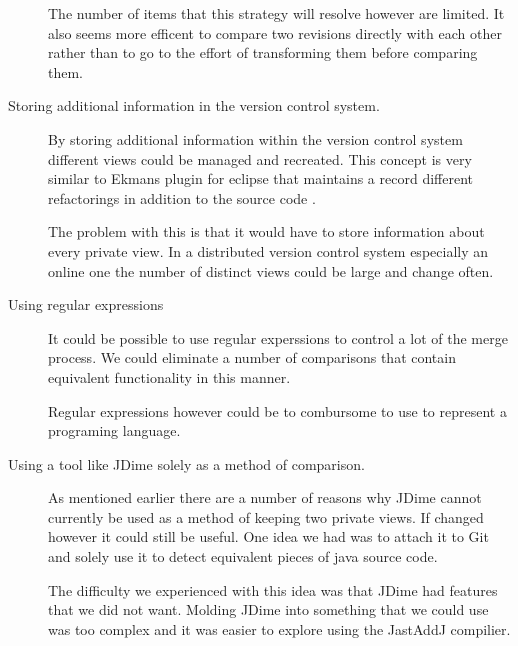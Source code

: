 \begin{description}
    The number of items that this strategy will resolve however are limited. It also seems more efficent to compare two revisions directly with each other rather than to go to the effort of transforming them before comparing them. 
  \item [Storing additional information in the version control system.]
    By storing additional information within the version control system different views could be managed and recreated.
    This concept is very similar to Ekmans plugin for eclipse that maintains a record different refactorings in addition to the source code \cite{Ekman2004}.

    The problem with this is that it would have to store information about every private view.  In a distributed version control system especially an online one the number of distinct views could be large and change often.   
  \item [Using regular expressions]
   It could be possible to use regular experssions to control a lot of the merge process.  We could eliminate a number of comparisons that contain equivalent functionality in this manner.

   Regular expressions however could be to combursome to use to represent a programing language.

    
  \item [Using a tool like JDime solely as a method of comparison.]
    As mentioned earlier there are a number of reasons why JDime cannot currently be used as a method of keeping two private views. If changed however it could still be useful.  One idea we had was to attach it to Git and solely use it to detect equivalent pieces of java source code.

    The difficulty we experienced with this idea was that JDime had features that we did not want.  Molding JDime into something that we could use was too complex and it was easier to explore using the JastAddJ compilier. 
\end{description}

